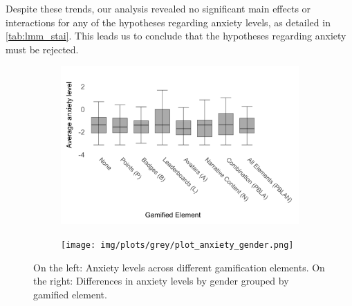 Despite these trends, our analysis revealed no significant main effects or interactions for any of the hypotheses regarding anxiety levels, as detailed in \autoref{tab:lmm_stai}.
This leads us to conclude that the hypotheses regarding anxiety must be rejected.


\begin{figure}[h]
    \centering
    \begin{subfigure}[b]{0.45\textwidth}
        \includegraphics[width=\textwidth]{img/plots/grey/plot_anxiety.png}
    \end{subfigure}
    \hfill
    \begin{subfigure}[b]{0.45\textwidth}
        \texttt{[image: img/plots/grey/plot\_anxiety\_gender.png]}
    \end{subfigure}
    \caption{On the left: Anxiety levels across different gamification elements. On the right: Differences in anxiety levels by gender grouped by gamified element.}
    \label{fig:anxiety_comparison}
\end{figure}

